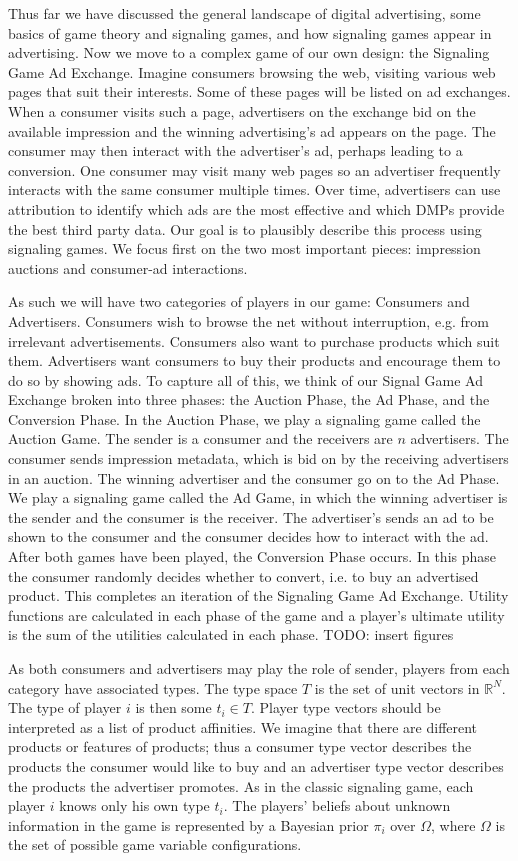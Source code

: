 \documentclass{article}
\begin{document}
Thus far we have discussed the general landscape of digital advertising, some basics of game theory and signaling games, and how signaling games appear in advertising. Now we move to a complex game of our own design: the Signaling Game Ad Exchange. Imagine consumers browsing the web, visiting various web pages that suit their interests. Some of these pages will be listed on ad exchanges. When a consumer visits such a page, advertisers on the exchange bid on the available impression and the winning advertising's ad appears on the page. The consumer may then interact with the advertiser's ad, perhaps leading to a conversion. One consumer may visit many web pages so an advertiser frequently interacts with the same consumer multiple times. Over time, advertisers can use attribution to identify which ads are the most effective and which DMPs provide the best third party data. Our goal is to plausibly describe this process using signaling games. We focus first on the two most important pieces: impression auctions and consumer-ad interactions.

As such we will have two categories of players in our game: Consumers and Advertisers. Consumers wish to browse the net without interruption, e.g. from irrelevant advertisements. Consumers also want to purchase products which suit them. Advertisers want consumers to buy their products and encourage them to do so by showing ads. To capture all of this, we think of our Signal Game Ad Exchange broken into three phases: the Auction Phase, the Ad Phase, and the Conversion Phase. In the Auction Phase, we play a signaling game called the Auction Game. The sender is a consumer and the receivers are $n$ advertisers. The consumer sends impression metadata, which is bid on by the receiving advertisers in an auction. The winning advertiser and the consumer go on to the Ad Phase. We play a signaling game called the Ad Game, in which the winning advertiser is the sender and the consumer is the receiver. The advertiser's sends an ad to be shown to the consumer and the consumer decides how to interact with the ad. After both games have been played, the Conversion Phase occurs. In this phase the consumer randomly decides whether to convert, i.e. to buy an advertised product. This completes an iteration of the Signaling Game Ad Exchange. Utility functions are calculated in each phase of the game and a player's ultimate utility is the sum of the utilities calculated in each phase. TODO: insert figures

As both consumers and advertisers may play the role of sender, players from each category have associated types. The type space $T$ is the set of unit vectors in $\mathbb{R}^N$. The type of player $i$ is then some $t_i \in T$. Player type vectors should be interpreted as a list of product affinities. We imagine that there are different products or features of products; thus a consumer type vector describes the products the consumer would like to buy and an advertiser type vector describes the products the advertiser promotes.  As in the classic signaling game, each player $i$ knows only his own type $t_i$. The players' beliefs about unknown information in the game is represented by a Bayesian prior $\pi_i$ over $\Omega$, where $\Omega$ is the set of possible game variable configurations. 
\end{document}
